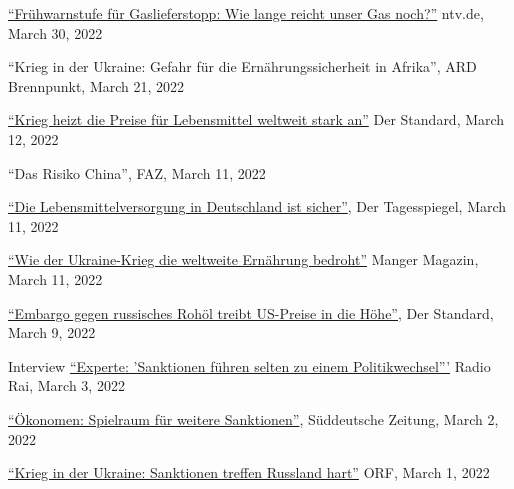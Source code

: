 \documentclass{article}
\begin{document}
\begin{minipage}[t]{0.12\textwidth}
\hspace{0mm}
\end{minipage}
\hspace{5mm}
\begin{minipage}[t]{0.8\textwidth}
    \href{https://www.n-tv.de/wirtschaft/Wie-lange-reicht-unser-Gas-noch-article23234226.html}{``Frühwarnstufe für Gaslieferstopp: Wie lange reicht unser Gas noch?''} ntv.de, March 30, 2022 \par
    ``Krieg in der Ukraine: Gefahr für die Ernährungssicherheit in Afrika'', ARD Brennpunkt, March 21, 2022 \par
    \href{https://www.derstandard.de/story/2000134038874/krieg-heizt-die-preise-fuer-lebensmittel-weltweit-stark-an}{``Krieg heizt die Preise für Lebensmittel weltweit stark an''} Der Standard, March 12, 2022 \par
    ``Das Risiko China'', FAZ, March 11, 2022 \par
    \href{https://www.tagesspiegel.de/wirtschaft/agrarminister-cem-oezdemir-zu-den-folgen-des-kriegs-die-lebensmittelversorgung-in-deutschland-ist-sicher/28155160.html}{``Die Lebensmittelversorgung in Deutschland ist sicher''}, Der Tagesspiegel, March 11, 2022 \par
    \href{https://www.manager-magazin.de/politik/wie-es-um-die-ernaehrungssicherheit-steht-ausfall-der-ukraine-als-getreide-exporteur-trifft-afrika-hart-a-fdf304e9-e490-4d78-8cf1-f56464958af1}{``Wie der Ukraine-Krieg die weltweite Ernährung bedroht''} Manger Magazin, March 11, 2022 \par
    \href{https://www.derstandard.at/story/2000133979024/embargo-gegen-russisches-rohoel-treibt-us-preise-in-die-hoehe}{``Embargo gegen russisches Rohöl treibt US-Preise in die Höhe''}, Der Standard, March 9, 2022 \par
    Interview \href{https://www.rainews.it/tgr/tagesschau/audio/2022/03/tag-Hendrik-Mahlkow-Institut-fuer-Weltwirtschaft-Kiel-Sanktionen-Russland-Ukrainekrieg-4be0c70d-61c5-4749-9088-689b3ee625f2.html}{``Experte: 'Sanktionen führen selten zu einem Politikwechsel'''} Radio Rai, March 3, 2022 \par
    \href{https://www.sueddeutsche.de/wirtschaft/strafmassnahmen-oekonomen-spielraum-fuer-weitere-sanktionen-1.5538934}{``Ökonomen: Spielraum für weitere Sanktionen''}, Süddeutsche Zeitung, March 2, 2022 \par
    \href{https://orf.at/stories/3250156/}{``Krieg in der Ukraine: Sanktionen treffen Russland hart''} ORF, March 1, 2022 \par

\end{minipage}
\end{document}
